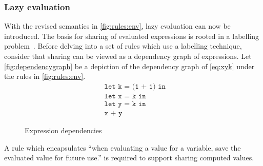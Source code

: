 \documentclass[11pt,oneside,a4paper]{report}
\begin{document}
\subsubsection{Lazy evaluation}
With the revised semantics in \autoref{fig:rules:env}, lazy evaluation can now be introduced.
The basis for sharing of evaluated expressions is rooted in a labelling problem~\cite{levy1988sharing}.
Before delving into a set of rules which use a labelling technique, consider that sharing can be viewed as a dependency graph of expressions.
Let \autoref{fig:dependencygraph} be a depiction of the dependency graph of \autoref{eq:xyk} under the rules in \autoref{fig:rules:env}.
\begin{align}
  &\texttt{let k = (1 + 1) in }\label{eq:xyk}\\
  &\texttt{let x = k in }\tag*{}\\
  &\texttt{let y = k in }\tag*{}\\
  &\texttt{x + y}\tag*{}
\end{align}
\begin{figure}[ht]
  \centering
  \caption{Expression dependencies}
  \label{fig:dependencygraph}
\end{figure}
A rule which encapsulates ``when evaluating a value for a variable, save the evaluated value for future use.'' is required to support sharing computed values.
\begin{figure}[ht]
  \begin{mdframed}
    \begin{prooftree}
    \end{prooftree}
  \end{mdframed}
  \caption{}
  \label{fig:eval:share}
\end{figure}
\end{document}
